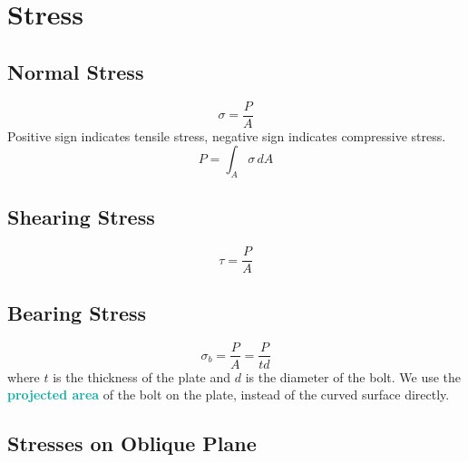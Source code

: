 \documentclass[twoside]{article}
\newcommand{\highlightbluetext}[1]{\textcolor[HTML]{09ACA6}{\textbf{#1}}}
\begin{document}
	\fancyfoot{}
	\fancyfoot[RO, LE]{\thepage}
	\renewcommand{\footrule}{%
		\vspace{26pt}\hrulefill
		\raisebox{-2.1pt}{\quad \decofourleft \decotwo \decofourright \quad}\hrulefill}
	
	\setcounter{page}{1}
	
	\section{Stress}
	
	\subsection{Normal Stress}

	\begin{equation}
		\sigma = \frac{P}{A}
		\label{eq:NormalStress}
	\end{equation}
	Positive sign indicates tensile stress, negative sign indicates compressive stress.
	\begin{equation}
		P = \int_A \sigma \, dA
		\label{eq:NormalStressIntegral}
	\end{equation}
	
	\subsection{Shearing Stress}

	\begin{equation}
		\tau = \frac{P}{A}
		\label{eq:ShearingStress}
	\end{equation}
	
	\subsection{Bearing Stress}

	\begin{equation}
		\sigma_b = \frac{P}{A} = \frac{P}{td}
		\label{eq:BearingStress}
	\end{equation}
	where $t$ is the thickness of the plate and $d$ is the diameter of the bolt. We use the \highlightbluetext{projected area} of the bolt on the plate, instead of the curved surface directly.
	
	\subsection{Stresses on Oblique Plane}
	
\end{document}
